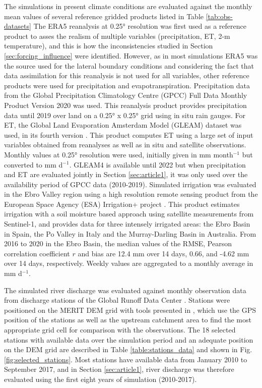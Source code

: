 The simulations in present climate conditions are evaluated against the monthly mean values of several reference gridded products listed in Table \ref{tab:obs-datasets}
The ERA5 reanalysis \citep{hersbach_era5_2020} at 0.25° resolution was first used as a reference product to asses the realism of multiple variables (precipitation, ET, 2-m temperature), and this is how the inconsistencies studied in Section \ref{sec:forcing_influence} were identified. However, as in most simulations ERA5 was the source used for the lateral boundary conditions and considering the fact that data assimilation for this reanalysis is not used for all variables, other reference products were used for precipitation and evapotranspiration.
Precipitation data from the Global Precipitation Climatology Centre (GPCC) Full Data Monthly Product Version 2020 \citep{gpcc_v2020} was used. This reanalysis product provides precipitation data until 2019 over land on a 0.25° x 0.25° grid using in situ rain gauges. 
For ET, the Global Land Evaporation Amsterdam Model (GLEAM) dataset was used, in its fourth version \citep{miralles_gleam4_2025}. This product computes ET using a large set of input variables obtained from reanalyses as well as in situ and satellite observations. Monthly values at 0.25° resolution were used, initially given in mm month$^{-1}$ but converted to mm d$^{-1}$. GLEAM4 is available until 2022 but when precipitation and ET are evaluated jointly in Section \ref{sec:article1}, it was only used over the availability period of GPCC data (2010-2019).
Simulated irrigation was evaluated in the Ebro Valley region using a high resolution remote sensing product from the European Space Agency (ESA) Irrigation+ project \citep{dari_regional_2023}. This product estimates irrigation with a soil moisture based approach using satellite measurements from Sentinel-1, and provides data for three intensely irrigated areas: the Ebro Basin in Spain, the Po Valley in Italy and the Murray-Darling Basin in Australia. From 2016 to 2020 in the Ebro Basin, the median values of the RMSE, Pearson correlation coefficient $r$ and bias are 12.4 mm over 14 days, 0.66, and -4.62 mm over 14 days, respectively. Weekly values are aggregated to a monthly average in mm d$^{-1}$. 

The simulated river discharge was evaluated against monthly observation data from discharge stations of the Global Runoff Data Center \cite[GRDC, https://grdc.bafg.de,][]{fekete_global_2003}.
Stations were positioned on the MERIT DEM grid with tools presented in \cite{polcher_hydrological_2023}, which use the GPS position of the stations as well as the upstream catchment area to find the most appropriate grid cell for comparison with the observations. 
The 18 selected stations with available data over the simulation period and an adequate position on the DEM grid are described in Table \ref{table:stations_data} and shown in Fig. \ref{fig:selected_stations}. Most stations have available data from January 2010 to September 2017, and in Section \ref{sec:article1}, river discharge was therefore evaluated using the first eight years of simulation (2010-2017).

